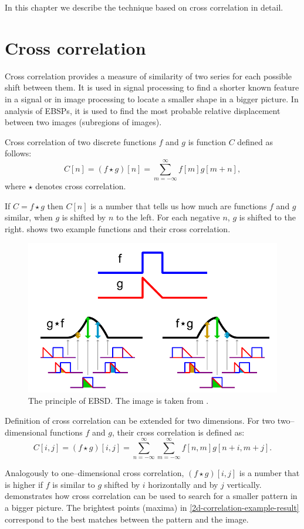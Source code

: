 In this chapter we describe the technique based on cross correlation in detail.

\section{Cross correlation}

Cross correlation provides a measure of similarity of two series for each possible shift between them. It is used in signal processing to find a shorter known feature in a signal or in image processing to locate a smaller shape in a bigger picture. In analysis of EBSPs, it is used to find the most probable relative displacement between two images (subregions of images).

Cross correlation of two discrete functions $f$ and $g$ is function $C$ defined as follows:
$$
C[n] = (f \star g)[n] = \sum_{m=-\infty}^{\infty}f[m]g[m+n],
$$
where $\star$ denotes cross correlation.

If $C = f \star g$ then $C[n]$ is a number that tells us how much are functions $f$ and $g$ similar, when $g$ is shifted by $n$ to the left. For each negative $n$, $g$ is shifted to the right.  shows two example functions and their cross correlation.

\begin{figure}
	\centering
	\includegraphics[width=0.7\linewidth]{img/correlation}
	\caption{The principle of EBSD. The image is taken from \cite{correlation_example}.}
	\label{correlation-example}
\end{figure}

Definition of cross correlation can be extended for two dimensions. For two two--dimensional functions $f$ and $g$, their cross correlation is defined as:
$$
C[i,j] = (f \star g)[i,j] = \sum_{n=-\infty}^{\infty}\sum_{m=-\infty}^{\infty}f[n,m]g[n+i,m+j].
$$

Analogously to one--dimensional cross correlation, $(f \star g)[i,j]$ is a number that is higher if $f$ is similar to $g$ shifted by $i$ horizontally and by $j$ vertically.  demonstrates how cross correlation can be used to search for a smaller pattern in a bigger picture. The brightest points (maxima) in \cref{2d-correlation-example-result} correspond to the best matches between the pattern and the image.

